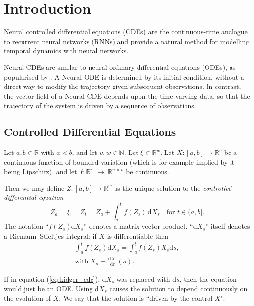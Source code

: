 \documentclass{article}
\newcommand{\dby}{\mathrm{d}}
\begin{document}
\section{Introduction}
Neural controlled differential equations (CDEs) \citep{kidger2020neural} are the continuous-time analogue to recurrent neural networks (RNNs) and provide a natural method for modelling temporal dynamics with neural networks.

Neural CDEs are similar to neural ordinary differential equations (ODEs), as popularised by \citet{neural2018ode}. A Neural ODE is determined by its initial condition, without a direct way to modify the trajectory given subsequent observations. In contrast, the vector field of a Neural CDE depends upon the time-varying data, so that the trajectory of the system is driven by a sequence of observations.

\subsection{Controlled Differential Equations}

Let $a, b \in \mathbb{R}$ with $a < b$, and let $v, w \in \mathbb{N}$. Let $\xi \in \mathbb{R}^w$. Let $X \colon [a, b] \to \mathbb{R}^v$ be a continuous function of bounded variation (which is for example implied by it being Lipschitz), and let $f \colon \mathbb{R}^w~\to~\mathbb{R}^{w \times v}$ be continuous.

Then we may define $Z \colon [a, b] \to \mathbb{R}^w$ as the unique solution to the \textit{controlled differential equation}
\begin{equation}
    Z_a = \xi,\quad Z_t = Z_a + \int^{t}_{a} f(Z_s)\,\dby X_s \quad \text{for } t \in (a, b].
    \label{eq:kidger_cde}
\end{equation}
The notation ``$f(Z_s) \dby X_s$'' denotes a matrix-vector product. ``$\dby X_s$'' itself denotes a Riemann--Stieltjes integral: if $X$ is differentiable then 
\begin{multline}
        \int_a^t f(Z_s) \dby X_s = \int_a^t f(Z_s) \dot X_s \dby s,\\ \text{with} \; \dot X_s = \frac{\dby X_r}{\dby r}(s).
\end{multline}


If in equation (\ref{eq:kidger_cde}), $\dby X_s$ was replaced with $\dby s$, then the equation would just be an ODE. Using $\dby X_s$ causes the solution to depend continuously on the evolution of $X$. We say that the solution is ``driven by the control $X$".
\end{document}
